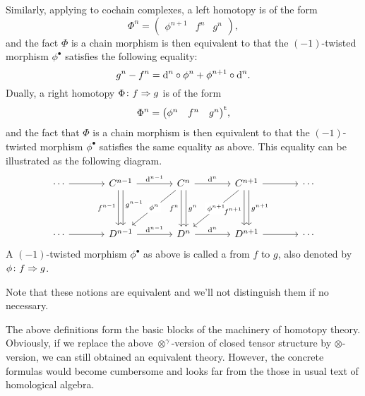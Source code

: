{Similarly, applying to cochain complexes, 
a left homotopy is of the form
\[
\Phi^n=
\begin{pmatrix}
\phi^{n+1} & f^n & g^n
\end{pmatrix},
\]
and the fact $\Phi$ is a chain morphism is then equivalent to 
that the $(-1)$-twisted morphism $\phi^{\bullet}$ 
satisfies the following equality:
\[
g^n - f^n = \mathrm{d}^n\circ\phi^n + \phi^{n+1}\circ\mathrm{d}^n.
\]
Dually, a right homotopy $\Phi\colon f\Rightarrow g$ is of the form
\[
\Phi^n = 
{\begin{pmatrix}
\phi^{n} & f^n & g^n
\end{pmatrix}}^{\rm t},
\]
and the fact that $\Phi$ is a chain morphism is then equivalent to 
that the $(-1)$-twisted morphism $\phi^{\bullet}$ 
satisfies the same equality as above.
This equality can be illustrated as the following diagram.
\[
\begin{tikzcd}[column sep=large, row sep=huge]
\cdots\ar[r] & 
C^{n-1}\ar[r,"{\di^{n-1}}"]
\ar[d,shift right,"{f^{n-1}}"']
\ar[d,shift left,pos=0.4,"{g^{n-1}}"] &
C^n\ar[r,"{\di^n}"]
\ar[d,shift right,"{f^n}"']
\ar[d,shift left,"{g^n}"]
\ar[dl,"{\phi^n}"description] &
C^{n+1}\ar[r]
\ar[dl,"{\phi^{n+1}}"description]
\ar[d,shift right,pos=0.6,"{f^{n+1}}"']
\ar[d,shift left,"{g^{n+1}}"]  & \cdots \\
\cdots\ar[r] & 
D^{n-1} \ar[r,"{\di^{n-1}}"] & 
D^n \ar[r,"{\di^n}"] & 
D^{n+1} \ar[r] & \cdots
\end{tikzcd}
\]
A $(-1)$-twisted morphism $\phi^{\bullet}$ as above 
is called a 
from $f$ to $g$, also denoted by $\phi\colon f\Rightarrow g$.

Note that these notions are equivalent and 
we'll not distinguish them if no necessary.
}
\begin{Rem}
The above definitions form the basic blocks of 
the machinery of homotopy theory. 
Obviously, if we replace the above $\otimes^{\gamma}$-version 
of closed tensor structure by $\otimes$-version, 
we can still obtained an equivalent theory. 
However, the concrete formulas would become cumbersome and 
looks far from the those in usual text of 
homological algebra.
\end{Rem}


